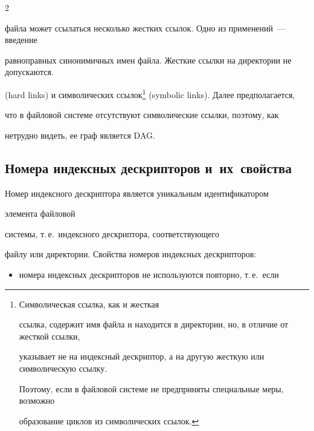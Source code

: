 \begin{multicols}{2}
{файла может ссылаться несколько жестких ссылок. Одно из применений~--- введение 


равноправных синонимичных имен файла. Жесткие ссылки на директории не допускаются.} 


(hard links) и символических ссылок\footnote{Символическая ссылка, как и жесткая 


ссылка, содержит имя файла и находится в директории, но, в отличие от жесткой ссылки, 


указывает не на индексный дескриптор, а на другую жесткую или символическую ссылку. 


Поэтому, если в файловой системе не предприняты специальные меры, возможно 


образование циклов из символических ссылок.} (symbolic links). Далее предполагается, 


что в файловой системе отсутствуют символические ссылки, поэтому, как 


нетрудно видеть, ее граф является DAG.





\vspace*{-4pt}


\subsection{Номера индексных дескрипторов и~их~свойства}





\vspace*{-2pt}





      Номер индексного дескриптора является уникальным идентификатором 


элемента файловой\linebreak


\vspace*{-12pt}


\pagebreak





\noindent


 сис\-те\-мы, т.\,е.\ индексного дескриптора, соответствующего 


файлу или директории.  Свойства номеров индексных дескрипторов:


      \begin{itemize}


\item номера индексных дескрипторов не используются повторно, т.\,е.\ если 



\end{itemize}
\end{multicols}
